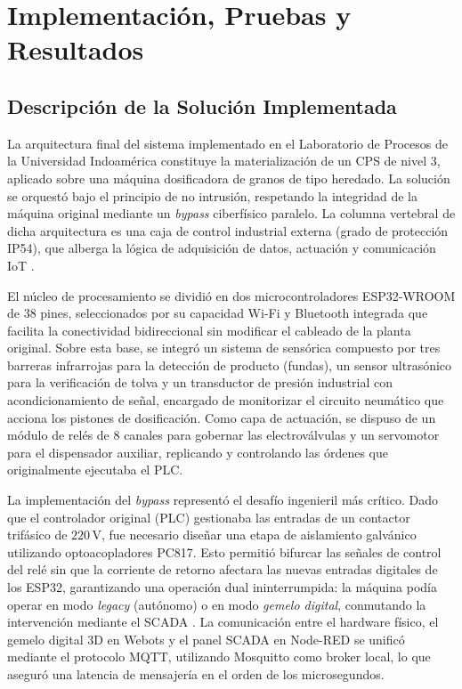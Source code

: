 \chapter{Implementación, Pruebas y Resultados}
\label{chap:implementacion}

\section{Descripción de la Solución Implementada}
La arquitectura final del sistema implementado en el Laboratorio de Procesos de la Universidad Indoamérica constituye la materialización de un CPS de nivel 3, aplicado sobre una máquina dosificadora de granos de tipo heredado. La solución se orquestó bajo el principio de no intrusión, respetando la integridad de la máquina original mediante un \textit{bypass} ciberfísico paralelo. La columna vertebral de dicha arquitectura es una caja de control industrial externa (grado de protección IP54), que alberga la lógica de adquisición de datos, actuación y comunicación IoT \cite{Kritzinger2018DigitalTwin}.

El núcleo de procesamiento se dividió en dos microcontroladores ESP32-WROOM de 38 pines, seleccionados por su capacidad Wi-Fi y Bluetooth integrada que facilita la conectividad bidireccional sin modificar el cableado de la planta original. Sobre esta base, se integró un sistema de sensórica compuesto por tres barreras infrarrojas para la detección de producto (fundas), un sensor ultrasónico para la verificación de tolva y un transductor de presión industrial con acondicionamiento de señal, encargado de monitorizar el circuito neumático que acciona los pistones de dosificación. Como capa de actuación, se dispuso de un módulo de relés de 8 canales para gobernar las electroválvulas y un servomotor para el dispensador auxiliar, replicando y controlando las órdenes que originalmente ejecutaba el PLC.

La implementación del \textit{bypass} representó el desafío ingenieril más crítico. Dado que el controlador original (PLC) gestionaba las entradas de un contactor trifásico de $220\,\text{V}$, fue necesario diseñar una etapa de aislamiento galvánico utilizando optoacopladores PC817. Esto permitió bifurcar las señales de control del relé sin que la corriente de retorno afectara las nuevas entradas digitales de los ESP32, garantizando una operación dual ininterrumpida: la máquina podía operar en modo \textit{legacy} (autónomo) o en modo \textit{gemelo digital}, conmutando la intervención mediante el SCADA \cite{Monostori2016CPS}. La comunicación entre el hardware físico, el gemelo digital 3D en Webots y el panel SCADA en Node-RED se unificó mediante el protocolo MQTT, utilizando Mosquitto como broker local, lo que aseguró una latencia de mensajería en el orden de los microsegundos.

